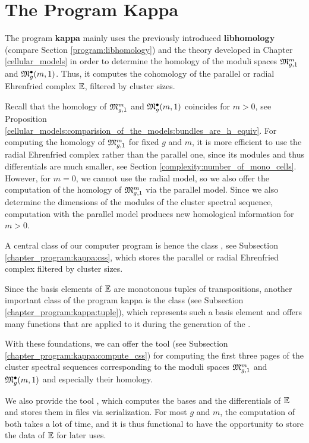 \section{The Program Kappa}
\label{chapter_program:kappa}

The program {\bfseries kappa} mainly uses the previously introduced {\bfseries libhomology} (compare Section \ref{program:libhomology}) 
and the theory developed in Chapter \ref{cellular_models}
in order to determine the homology of the moduli spaces $\Modspc[1]$ and $\ModspcRad[1]$. 
Thus, it computes the cohomology of the parallel or radial Ehrenfried complex $\Ehrprog$,
filtered by cluster sizes.

Recall that the homology of $\Modspc[1]$ and $\ModspcRad[1]$ coincides for $m > 0$, see Proposition \ref{cellular_models:comparision_of_the_models:bundles_are_h_equiv}.
For computing the homology of $\Modspc[1]$ for fixed $g$ and $m$, 
it is more efficient to use the radial Ehrenfried complex rather than the parallel one, 
since its modules and thus differentials are much smaller, see Section \ref{complexity:number_of_mono_cells}.
However, for $m = 0$, we cannot use the radial model, so we also offer the computation of the homology of $\Modspc[1]$ via the parallel model.
Since we also determine the dimensions of the modules of the cluster spectral sequence, 
computation with the parallel model produces new homological information for $m > 0$.

A central class of our computer program is hence the class , see Subsection \ref{chapter_program:kappa:css},
which stores the parallel or radial Ehrenfried complex filtered by cluster sizes.

Since the basis elements of $\Ehrprog$ are monotonous tuples of transpositions,
another important class of the program kappa is the class  (see Subsection \ref{chapter_program:kappa:tuple}),
which represents such a basis element and offers many functions that are applied to it
during the generation of the .

With these foundations, we can offer the tool  (see Subsection \ref{chapter_program:kappa:compute_css}) 
for computing the first three pages of the cluster spectral sequences corresponding to the moduli spaces $\Modspc[1]$ and $\ModspcRad[1]$
and especially their homology.

We also provide the tool ,
which computes the bases and the differentials of $\Ehrprog$ and stores them in files via serialization.
For most $g$ and $m$, 
the computation of both takes a lot of time,
and it is thus functional to have the opportunity to store the data of $\Ehrprog$ for later uses.

